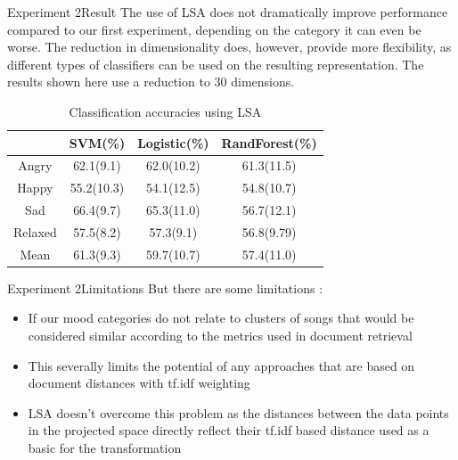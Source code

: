 \documentclass{beamer}
\begin{document}
\begin{frame}{Experiment 2}{Result}
{\small The use of LSA does not dramatically improve performance compared to our first experiment, depending on the category it can even be worse. The reduction in dimensionality does, however, provide more flexibility, as different types of classifiers can be used on the resulting representation. The results shown here use a reduction to 30 dimensions.}
	\begin{table}[tbh]
		\centering
		
		\begin{tabular}{|c|c|c|c|}
		\hline
		        & SVM(\%) & Logistic(\%) & RandForest(\%) \\ \hline
		  Angry & 62.1(9.1) & 62.0(10.2) & 61.3(11.5) \\ %
		  Happy & 55.2(10.3) & 54.1(12.5) & 54.8(10.7) \\ %
		  Sad & 66.4(9.7) & 65.3(11.0) & 56.7(12.1) \\ %
		  Relaxed & 57.5(8.2) & 57.3(9.1) & 56.8(9.79) \\ \hline
		  Mean & 61.3(9.3) & 59.7(10.7) & 57.4(11.0) \\ \hline
		  
		  
		   
		
		
		\end{tabular}
		\caption{Classification accuracies using LSA}
	\end{table}  
\end{frame}


\begin{frame}{Experiment 2}{Limitations}
But there are some limitations :
\begin{itemize}
\item
{
	If our mood categories do not relate to clusters of songs that would be considered similar according to the metrics used in document retrieval
} \pause
\item
{
	This severally limits the potential of any approaches that are based on document distances with tf.idf weighting
} \pause
\item
{
	LSA doesn't overcome this problem as the distances between the data points in the projected space directly reflect their tf.idf based distance used as a basic for the transformation
}

\end{itemize}
\end{frame}
\end{document}
